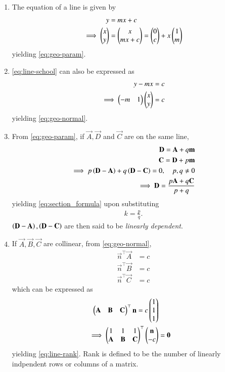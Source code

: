 \begin{enumerate}[label=\thesection.\arabic*.,ref=\thesection.\theenumi]
\item The equation of a line is given by 
\begin{align}
			\label{eq:line-school}
	y &= mx + c
	\\
	\implies \begin{pmatrix}x \\ y\end{pmatrix} &= \begin{pmatrix}x \\ 
	 mx + c\end{pmatrix} =\begin{pmatrix}0 \\ c\end{pmatrix} + x\begin{pmatrix}1 \\ m\end{pmatrix}
\end{align}
			yielding \eqref{eq:geo-param}.
\item 			\eqref{eq:line-school} can also be expressed as
\begin{align}
	y - mx &= c 
	\\
	\implies \begin{pmatrix}-m & 1\end{pmatrix}\begin{pmatrix}x \\ y\end{pmatrix} &= c
\end{align}
			yielding \eqref{eq:geo-normal}.
  \item From \eqref{eq:geo-param}, 
	  if $\vec{A},\vec{D}$ and $\vec{C}$ are on the same line,
		\label{prop:lin-dep}
\begin{align}
			\mathbf{D}=\mathbf{A}+q\mathbf{m} 
			\\ 
			\mathbf{C}=\mathbf{D}+p\mathbf{m} \\
			\label{eq:collinear} 
			\implies 	p\left(\mathbf{D}-\mathbf{A}\right) 
			+ q\left(\mathbf{D}-\mathbf{C}\right) = 0, \quad p, q \ne 0 \\ 
			\implies \mathbf{D} = \frac{p\mathbf{A}+q\mathbf{C}}{p+q} 
			\end{align} 
			yielding \eqref{eq:section_formula} upon substituting \begin{align} k = \frac{p}{q}. \end{align} 
			$\left(\mathbf{D}-\mathbf{A}\right), \left(\mathbf{D}-\mathbf{C}\right)$ 
		are then said to be {\em linearly dependent}.
	\item If $\vec{A}, \vec{B}, \vec{C}$ are collinear,  from \eqref{eq:geo-normal}, \begin{align}
	 \vec{n}^{\top}\vec{A} &=  c 
	 \\
	 \vec{n}^{\top}\vec{B} &=  c 
	 \\
	 \vec{n}^{\top}\vec{C} &=  c 
\end{align}
which can be expressed as 
\begin{align}
	\begin{pmatrix} \mathbf{A} & \mathbf{B} & \mathbf{C}\end{pmatrix}^{\top}\mathbf{n} = c\begin{pmatrix}1 \\ 1 \\ 1\end{pmatrix}
	\\
	\implies 
	\begin{pmatrix} 1 & 1 &1 \\ \mathbf{A} & \mathbf{B} & \mathbf{C}\end{pmatrix}^{\top}\begin{pmatrix}\mathbf{n} \\ -c\end{pmatrix} &= \mathbf{0}
\end{align}
yielding
			\eqref{eq:line-rank}.  Rank is defined to be the number of linearly indpendent rows or columns of a matrix.


\end{enumerate}
